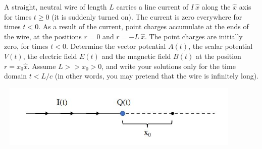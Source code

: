 \documentclass[fleqn]{article}
\begin{document}
\begin{enumerate}
  A straight, neutral wire of length $L$ carries a line current of $I ~ \hat{x}$ along the $\hat{x}$ axis for times
  $t \ge 0$  (it is suddenly turned on). The current is zero everywhere for times $t < 0$. As a result of the current,
  point charges accumulate at the ends of the wire, at the positions $r=0$ and $r=-L ~ \hat{x}$. The point charges
  are initially zero, for times $t < 0$. Determine the vector potential $A(t)$, the scalar potential $V(t)$, the
  electric field $E(t)$ and the magnetic field $B(t)$ at the position $r=x_0 \hat{x}$. Assume $L >> x_0 > 0$, and 
  write your solutions only for the time domain $t < L/c$ (in other words, you may pretend that the
  wire is infinitely long).
  \begin{center}
    \includegraphics[height=3cm, width=12cm]{2.JPG}
  \end{center}


\end{enumerate}
\end{document}

